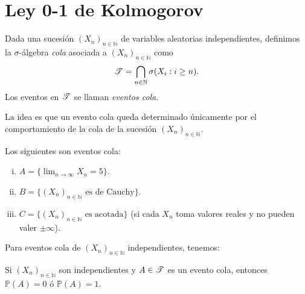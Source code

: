 
\section{Ley 0-1 de Kolmogorov}

Dada una sucesión \((X_n)_{n\in\mathbb{N}}\) de variables aleatorias independientes, definimos la \(\sigma\)-álgebra \textit{cola} asociada a \((X_n)_{n\in\mathbb{N}}\) como
\[
\mathscr{T} = \bigcap_{n\in\mathbb{N}} \sigma(X_i : i \ge n).
\]
Los eventos en \(\mathscr{T}\) se llaman \textit{eventos cola}.

La idea es que un evento cola queda determinado únicamente por el comportamiento de la cola de la sucesión \((X_n)_{n\in\mathbb{N}}\).

\begin{eg}
    Los siguientes son eventos cola:
    \begin{enumerate}[i)]
        \item \(A = \{\displaystyle \lim_{n\to\infty} X_n = 5\}\).
        \item \(B = \{(X_n)_{n\in\mathbb{N}} \text{ es de Cauchy}\}\).
        \item \(C = \{(X_n)_{n\in\mathbb{N}} \text{ es acotada}\}\) (si cada \(X_n\) toma valores reales y no pueden valer \(\pm\infty\)).
    \end{enumerate}
\end{eg}

\noindent Para eventos cola de \((X_n)_{n\in\mathbb{N}}\) independientes, tenemos:

\begin{theorem}
	Si \((X_n)_{n\in\mathbb{N}}\) son independientes y \(A \in \mathscr{T}\) es un evento cola, entonces \(\mathbb{P}(A) = 0\) ó \(\mathbb{P}(A) = 1\).
\end{theorem}

